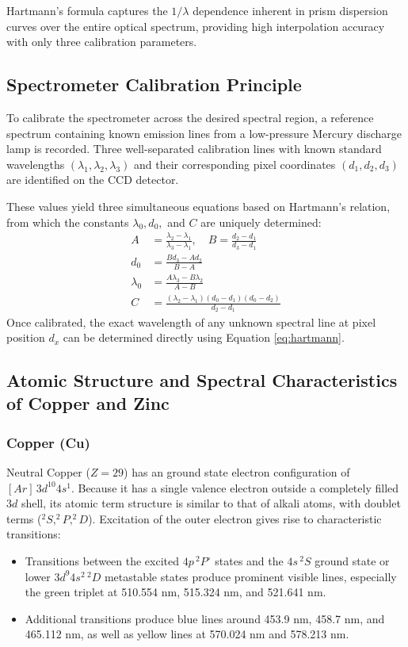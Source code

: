 \documentclass[12pt, a4paper]{article}
\begin{document}
Hartmann's formula captures the $1/\lambda$ dependence inherent in prism dispersion curves over the entire optical spectrum, providing high interpolation accuracy with only three calibration parameters.

\subsection{Spectrometer Calibration Principle}
To calibrate the spectrometer across the desired spectral region, a reference spectrum containing known emission lines from a low-pressure Mercury discharge lamp is recorded. Three well-separated calibration lines with known standard wavelengths $(\lambda_1, \lambda_2, \lambda_3)$ and their corresponding pixel coordinates $(d_1, d_2, d_3)$ are identified on the CCD detector. 

These values yield three simultaneous equations based on Hartmann's relation, from which the constants $\lambda_0, d_0,$ and $C$ are uniquely determined:
\begin{align}
    A &= \frac{\lambda_2 - \lambda_1}{\lambda_3 - \lambda_1}, \quad B = \frac{d_2 - d_1}{d_3 - d_1} \\[1.5ex]
    d_0 &= \frac{B d_3 - A d_2}{B - A} \\[1.5ex]
    \lambda_0 &= \frac{A \lambda_3 - B \lambda_2}{A - B} \\[1.5ex]
    C &= \frac{(\lambda_2 - \lambda_1)(d_0 - d_1)(d_0 - d_2)}{d_2 - d_1}
\end{align}
Once calibrated, the exact wavelength of any unknown spectral line at pixel position $d_x$ can be determined directly using Equation \eqref{eq:hartmann}.

\subsection{Atomic Structure and Spectral Characteristics of Copper and Zinc}
\subsubsection{Copper (Cu)}
Neutral Copper ($Z = 29$) has an ground state electron configuration of $[Ar]\, 3d^{10} 4s^1$. Because it has a single valence electron outside a completely filled $3d$ shell, its atomic term structure is similar to that of alkali atoms, with doublet terms ($^2S, ^2P, ^2D$). Excitation of the outer electron gives rise to characteristic transitions:
\begin{itemize}
    \item Transitions between the excited $4p\,^2P^\circ$ states and the $4s\,^2S$ ground state or lower $3d^9 4s^2\,^2D$ metastable states produce prominent visible lines, especially the green triplet at 510.554 nm, 515.324 nm, and 521.641 nm.
    \item Additional transitions produce blue lines around 453.9 nm, 458.7 nm, and 465.112 nm, as well as yellow lines at 570.024 nm and 578.213 nm.
\end{itemize}
\end{document}
